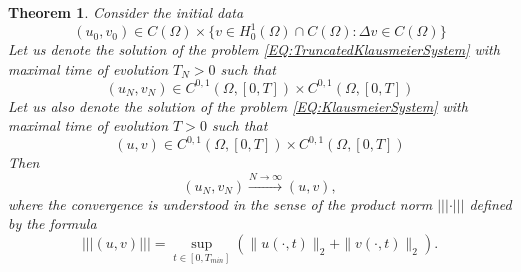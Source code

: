 \documentclass[12pt, a4paper]{article}
\theoremstyle{break}
\newtheorem{thm}{Theorem}[section]
\theoremstyle{break}
\theoremstyle{break}
\theoremstyle{break}
\theoremstyle{break}
\theoremstyle{break}
\theoremstyle{break}
\begin{document}
\begin{thm}
    \label{thm:ApproximationWithFiniteKernels}
    Consider the initial data 
    $$(u_0, v_0) \in C(\Omega) \times \{v \in H^1_0(\Omega) \cap C(\Omega): \Delta v \in C(\Omega)\}$$
    Let us denote the solution of the problem \eqref{EQ:TruncatedKlausmeierSystem} with maximal time of evolution $T_N > 0$ such that
    $$(u_N, v_N) \in C^{0, 1}(\Omega, [0,T]) \times C^{0, 1}(\Omega, [0,T])$$
    Let us also denote the solution of the problem \eqref{EQ:KlausmeierSystem} with maximal time of evolution $T > 0$ such that
    $$(u, v) \in C^{0, 1}(\Omega, [0,T]) \times C^{0, 1}(\Omega, [0,T])$$
    Then
    \begin{equation*}
        (u_N, v_N) \xrightarrow{N \rightarrow \infty} (u, v),
    \end{equation*}
    where the convergence is understood in the sense of the product norm $||| \cdot |||$ defined by the formula
    \begin{equation}
        ||| (u, v) ||| = \sup_{t \in [0, T_{min}]}\left(\| u(\cdot, t) \|_2 + \|v(\cdot, t) \|_2 \right).
    \end{equation}
\end{thm}
\end{document}
